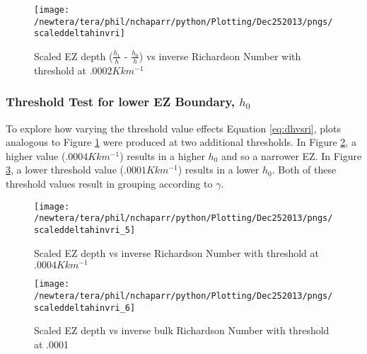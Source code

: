 \begin{figure}[htbp]
\centering
 \texttt{[image: /newtera/tera/phil/nchaparr/python/Plotting/Dec252013/pngs/scaleddeltahinvri]}
       
        \caption{Scaled EZ depth ($\frac{h_{1}}{h}$ - $\frac{h_{0}}{h}$) vs inverse Richardson Number with threshold at $.0002Kkm^{-1}$}
         \label{fig:scaledeltahinvri}
\end{figure}

\clearpage
\subsubsection{Threshold Test for lower \acs{EZ} Boundary, $h_{0}$}
To explore how varying the threshold value effects Equation \ref{eq:dhvsri}, plots analogous to Figure \ref{fig:scaledeltahinvri} were produced at two 
additional thresholds.  In Figure \ref{fig:scaledeltahinvri1}, a higher value ($.0004Kkm^{-1}$) results in a higher $h_{0}$   
and so a narrower \acs{EZ}.
In Figure \ref{fig:scaledeltahinvri2}, a lower threshold value ($.0001Kkm^{-1}$) results in a lower $h_{0}$.  Both of these threshold values result in grouping according to $\gamma$.\\

\begin{figure}[htbp]
    \centering
    \texttt{[image: /newtera/tera/phil/nchaparr/python/Plotting/Dec252013/pngs/scaleddeltahinvri\_5]}
    \caption{Scaled EZ depth vs inverse Richardson Number with threshold at $.0004Kkm^{-1}$}
    \label{fig:scaledeltahinvri1}   %
\end{figure}

\begin{figure}[htbp]
    \centering
    \texttt{[image: /newtera/tera/phil/nchaparr/python/Plotting/Dec252013/pngs/scaleddeltahinvri\_6]}
    \caption{Scaled EZ depth vs inverse bulk Richardson Number with threshold at .0001}
    \label{fig:scaledeltahinvri2}   %
\end{figure}

